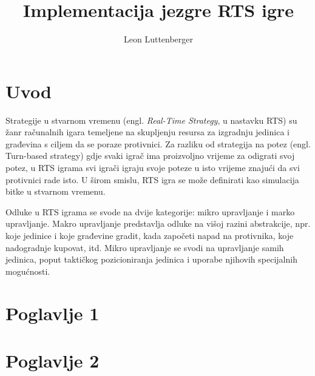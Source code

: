 \documentclass[times, utf8, zavrsni, numeric]{fer}
\begin{document}

\title{Implementacija jezgre RTS igre}

\author{Leon Luttenberger}

\maketitle

\izvornik

\zahvala{}

\tableofcontents

\chapter{Uvod}
\par Strategije u stvarnom vremenu (engl. \textit{Real-Time Strategy}, u nastavku RTS) su žanr računalnih igara temeljene na skupljenju resursa za izgradnju jedinica i građevina s ciljem da se poraze protivnici. Za razliku od strategija na potez (engl. Turn-based strategy) gdje svaki igrač ima proizvoljno vrijeme za odigrati svoj potez, u RTS igrama svi igrači igraju svoje poteze u isto vrijeme znajući da svi protivnici rade isto. U širom smislu, RTS igra se može definirati kao simulacija bitke u stvarnom vremenu\cite{url:WhatDoesRTSMean}.

Odluke u RTS igrama se svode na dvije kategorije: mikro upravljanje i marko upravljanje\cite{article:HybridPathdinding}. Makro upravljanje predstavlja odluke na višoj razini abstrakcije, npr. koje jedinice i koje građevine gradit, kada započeti napad na protivnika, koje nadogradnje kupovat, itd. Mikro upravljanje se svodi na upravljanje samih jedinica, poput taktičkog pozicioniranja jedinica i uporabe njihovih specijalnih mogućnosti.



\chapter{Poglavlje 1}

\chapter{Poglavlje 2}
\end{document}
